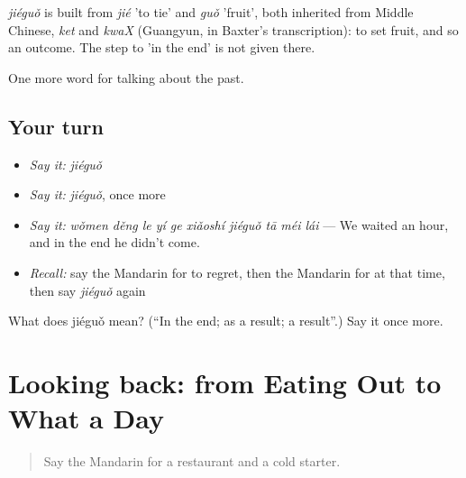 \begin{cousinweb}
\emph{jiéguǒ} is built from \emph{jié} 'to tie' and \emph{guǒ} 'fruit', both inherited from Middle Chinese, \emph{ket} and \emph{kwaX} (Guangyun, in Baxter's transcription): to set fruit, and so an outcome. The step to 'in the end' is not given there.
\end{cousinweb}

\begin{grammarlens}[title={What you've built}]
One more word for talking about the past.
\end{grammarlens}

\subsection*{Your turn}
\begin{itemize}
\raggedright
  \item \emph{Say it:} \emph{jiéguǒ}
  \item \emph{Say it:} \emph{jiéguǒ}, once more
  \item \emph{Say it:} \emph{wǒmen děng le yí ge xiǎoshí jiéguǒ tā méi lái} — We waited an hour, and in the end he didn't come.
  \item \emph{Recall:} say the Mandarin for to regret, then the Mandarin for at that time, then say \emph{jiéguǒ} again
\end{itemize}

\begin{tcolorbox}[breakable,colback=teal!4,colframe=teal!35!black,title={Before you move on}]
What does jiéguǒ mean? (\textquotedblleft{}In the end; as a result; a result\textquotedblright{}.) Say it once more.
\end{tcolorbox}
\section[(dialogue)]{Looking back: from Eating Out to What a Day}

\label{lesson:ZH-R187-review-182-187}



\begin{quote}
Say the Mandarin for a restaurant and a cold starter.
\end{quote}

